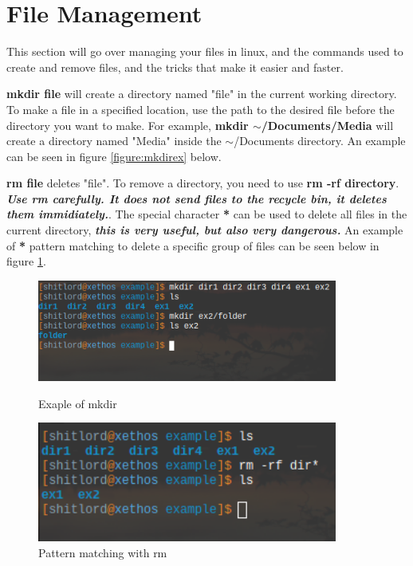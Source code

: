 \documentclass[12pt, letterpaper, twoside]{article}
\begin{document}
\newpage
\section{File Management}

This section will go over managing your files in linux, and the commands used to create and remove files, and the tricks that make it easier and faster.

\textbf{mkdir file} will create a directory named "file" in the current working directory. To make a file in a specified location, use the path to the desired file before the directory you want to make. For example, \textbf{mkdir $\mathtt{\sim}$/Documents/Media} will create a directory named "Media" inside the $\mathtt{\sim}$/Documents directory. An example can be seen in figure \ref{figure:mkdirex} below.

\textbf{rm file} deletes "file". To remove a directory, you need to use \textbf{rm -rf directory}. \textbf{\textit{Use rm carefully. It does not send files to the recycle bin, it deletes them immidiately.}}. The special character \textbf{*} can be used to delete all files in the current directory, \textbf{\textit{this is very useful, but also very dangerous.}} An example of \textbf{*} pattern matching to delete a specific group of files can be seen below in figure \ref{figure:rmpatex}. 

\begin{figure} [!htb]
  \includegraphics[width=0.88\textwidth]{mkdirex}
  \caption{Exaple of mkdir}\label{figure:mkdirex}
\endminipage\hfill
{}
\includegraphics[width=0.88\textwidth]{rmpatex}
  \caption{Pattern matching with rm}\label{figure:rmpatex}
\endminipage
\end{figure}
\end{document}
